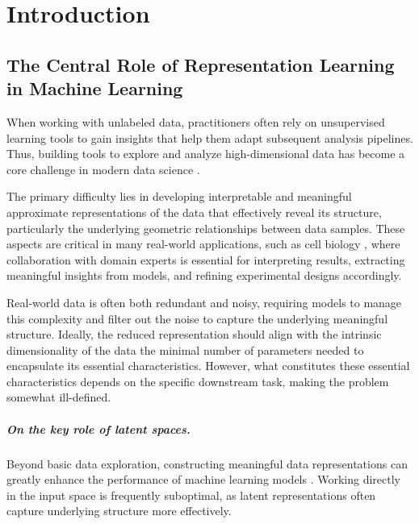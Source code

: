 \chapter{Introduction}\label{chap:intro}

\minitoc

\section{The Central Role of Representation Learning in Machine Learning}

When working with unlabeled data, practitioners often rely on unsupervised learning tools to gain insights that help them adapt subsequent analysis pipelines. Thus, building tools to explore and analyze high-dimensional data has become a core challenge in modern data science \citep{donoho2000high, rudin2022interpretable}. 

The primary difficulty lies in developing interpretable and meaningful approximate representations of the data that effectively reveal its structure, particularly the underlying geometric relationships between data samples. These aspects are critical in many real-world applications, such as cell biology \citep{regev2017human, kobak2019art, becht2019dimensionality}, where collaboration with domain experts is essential for interpreting results, extracting meaningful insights from models, and refining experimental designs accordingly.

Real-world data is often both redundant and noisy, requiring models to manage this complexity and filter out the noise to capture the underlying meaningful structure. Ideally, the reduced representation should align with the intrinsic dimensionality of the data \ie the minimal number of parameters needed to encapsulate its essential characteristics. However, what constitutes these essential characteristics depends on the specific downstream task, making the problem somewhat ill-defined.


\paragraph{On the key role of latent spaces.} 
Beyond basic data exploration, constructing meaningful data representations can greatly enhance the performance of machine learning models \citep{bengio2013representation}. Working directly in the input space is frequently suboptimal, as latent representations often capture underlying structure more effectively.

